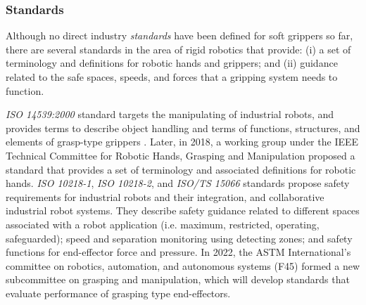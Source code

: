 \documentclass[lettersize,journal]{IEEEtran}
\begin{document}
\subsubsection{Standards}
Although no direct industry \emph{standards} have been defined for soft grippers so far, there are several standards in the area of rigid robotics that provide: (i) a set of terminology and definitions for robotic hands and grippers; and (ii) guidance related to the safe spaces, speeds, and forces that a gripping system needs to function. 

\emph{ISO 14539:2000} standard targets the manipulating of industrial robots, and provides terms to describe object handling and terms of functions, structures, and elements of grasp-type grippers \cite{ISO14539:2000}.
Later, in 2018, a working group under the IEEE Technical Committee for Robotic Hands, Grasping and Manipulation proposed a standard \cite{Falco2018} that provides a set of terminology and associated definitions for robotic hands. %
\emph{ISO 10218-1}, \emph{ISO 10218-2}, and \emph{ISO/TS 15066} standards propose safety requirements for industrial robots and their integration, and collaborative industrial robot systems. 
They describe safety guidance related to different spaces associated with a robot application (i.e. maximum, restricted, operating, safeguarded); speed and separation monitoring using detecting zones; and safety functions for end-effector force and pressure. 
In 2022, the ASTM International’s committee on robotics, automation, and autonomous systems (F45) formed a new subcommittee on grasping and manipulation, which will develop standards that evaluate performance of grasping type end-effectors.  

%
\end{document}
